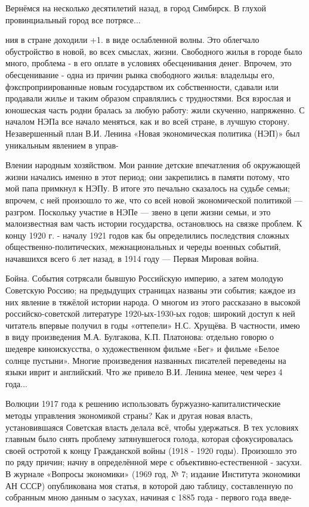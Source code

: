 \label{071-2}
Вернёмся на несколько десятилетий назад, в город Симбирск. В глухой провинциальный город все потрясе...

\label{072-1}
ния в стране доходили +1. в виде ослабленной волны. Это облегчало обустройство в новой, во всех смыслах, жизни. Свободного жилья в городе было много, проблема - в его оплате в условиях обесценивания денег. Впрочем, это обесценивание - одна из причин рынка свободного жилья: владельцы его, фэкспроприированные новым государством их собственности, сдавали или продавали жилье и таким образом справлялись с трудностями. Вся взрослая и юношеская часть родни бралась за любую работу: жили скученно, напряженно. С началом НЭПа все начало меняться, как и во всей стране, в лучшую сторону. Незавершенный план В.И. Ленина «Новая экономическая политика (НЭП)» был уникальным явлением в управ-

\label{073-1}
Влении народным хозяйством. Мои ранние детские впечатления об окружающей жизни начались именно в этот период; они закрепились в памяти потому, что мой папа примкнул к НЭПу. В итоге это печально сказалось на судьбе семьи; впрочем, с ней произошло то же, что со всей новой экономической политикой — разгром. Поскольку участие в НЭПе — звено в цепи жизни семьи, и это малоизвестная вам часть истории государства, остановлюсь на связке проблем. К концу 1920 г. - началу 1921 годов как бы определились последствия сложных общественно-политических, межнациональных и череды военных событий, начавшихся всего 6 лет назад, в 1914 году — Первая Мировая война.

\label{074-1}
Бойна. События сотрясали бывшую Российскую империю, а затем молодую Советскую Россию; на предыдущих страницах названы эти события; каждое из них явление в тяжёлой истории народа. О многом из этого рассказано в высокой российско-советской литературе 1920-ых-1930-ых годов; широкий доступ к ней читатель впервые получил в годы «оттепели» Н.С. Хрущёва. В частности, имею в виду произведения М.А. Булгакова, К.П. Платонова: отдельно говорю о шедевре киноискусства, о художественном фильме «Бег» и фильме «Белое солнце пустыни». Многие произведения названных писателей переведены на языки иврит и английский. Что же привело В.И. Ленина менее, чем через 4 года...

\label{075-1}
Волюции 1917 года к решению использовать буржуазно-капиталистические методы управления экономикой страны? Как и другая новая власть, установившаяся Советская власть делала всё, чтобы удержаться. В тех условиях главным было снять проблему затянувшегося голода, которая сфокусировалась своей остротой к концу Гражданской войны (1918 - 1920 годы). Произошло это по ряду причин; начну в определённой мере с объективно-естественной - засухи. В журнале «Вопросы экономики» (1969 год, № 7; издание Института экономики АН СССР) опубликована моя статья, в которой даю таблицу, составленную по собранным мною данным о засухах, начиная с 1885 года - первого года введе-

